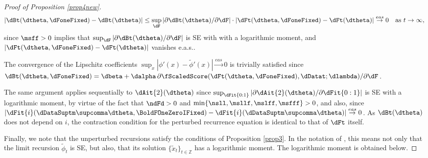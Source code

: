\begin{proof}[Proof of Proposition \ref{prop4new}]
\begin{equation*}
|\dBt(\dtheta,\dFoneFixed)-\dBt(\dtheta)|\leq 	\sup_{\dF} |\partial \dBt(\dtheta) / \partial \dF | \cdot |\dFt(\dtheta,\dFoneFixed) - \dFt(\dtheta)| \stackrel{eas}{\to}0 \quad \text{as} \ t\to \infty,
\end{equation*}  
since $\msff>0$ implies that $\sup_{\dF} |\partial \dBt(\dtheta) / \partial \dF |$ is SE with with a logarithmic moment, and  $|\dFt(\dtheta,\dFoneFixed) - \dFt(\dtheta)|$ vanishes e.a.s..

The convergence of the Lipschitz coefficients $\sup_{x}|\phi'(x)-\tilde \phi'(x)| \stackrel{eas}{\to} 0$ is trivially satisfied since $\dBt(\dtheta,\dFoneFixed) = \dbeta + \dalpha\,  \partial  \fScaledScore(\dFt(\dtheta,\dFoneFixed),\dDatat; \dlambda) / \partial \dF$.

The same argument applies sequentially to $\dAit{2}(\dtheta)$ since  $
\sup_{\dFit{0:1}}|\partial \dAit{2}(\dtheta) / \partial \dFit{0:1}|$ is SE with a logarithmic moment, by virtue of the fact that $\ndFd>0$ and $\min\{\nsll,\msllf,\mslff,\msfff\}>0$, and also, since $|\dFit{i}(\dDataSuptm\supcomma\dtheta,\BoldFOneZeroIFixed)- \dFit{i}(\dDataSuptm\supcomma\dtheta)| \stackrel{eas}{\to}0$. 
As $\dBt(\dtheta)$ does not depend on $i$, the contraction condition for the perturbed recurrence equation is identical to that of $\dFt$ itself.

Finally, we note that the unperturbed recursions  satisfy the conditions of Proposition \ref{prop3}. In the notation of \cite{smikosch2006},  this means not only that the limit recursion $\tilde{\phi}_{t}$ is SE, but also, that its solution $\{\tilde x_{t}\}_{t \in \mathbb{Z}}$ has a logarithmic moment. The logarithmic moment is obtained below.


\end{proof}

